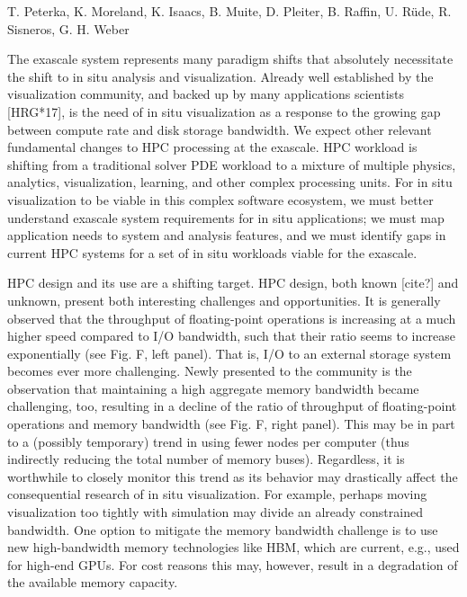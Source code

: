 
\license

 T. Peterka, K. Moreland, K. Isaacs, B. Muite, D. Pleiter, B. Raffin, U.  Rüde, R. Sisneros, G. H. Weber

\begin{refsection}

The exascale system represents many paradigm shifts that absolutely necessitate the shift to in situ analysis and visualization. Already well established by the visualization community, and backed up by many applications scientists [HRG*17], is the need of in situ visualization as a response to the growing gap between compute rate and disk storage bandwidth.
We expect other relevant fundamental changes to HPC processing at the exascale. HPC workload is shifting from a traditional solver PDE workload to a mixture of multiple physics, analytics, visualization, learning, and other complex processing units. For in situ visualization to be viable in this complex software ecosystem, we must better understand exascale system requirements for in situ applications; we must map application needs to system and analysis features, and we must identify gaps in current HPC systems for a set of in situ workloads viable for the exascale.

HPC design and its use are a shifting target. HPC design, both known [cite?] and unknown, present both interesting challenges and opportunities.
It is generally observed that the throughput of floating-point operations is increasing at a much higher speed compared to I/O bandwidth, such that their ratio seems to increase exponentially (see Fig. F, left panel). That is, I/O to an external storage system becomes ever more challenging. Newly presented to the community is the observation that maintaining a high aggregate memory bandwidth became challenging, too, resulting in a decline of the ratio of throughput of floating-point operations and memory bandwidth (see Fig. F, right panel). This may be in part to a (possibly temporary) trend in using fewer nodes per computer (thus indirectly reducing the total number of memory buses). Regardless, it is worthwhile to closely monitor this trend as its behavior may drastically affect the consequential research of in situ visualization. For example, perhaps moving visualization too tightly with simulation may divide an already constrained bandwidth. One option to mitigate the memory bandwidth challenge is to use new high-bandwidth memory technologies like HBM, which are current, e.g., used for high-end GPUs. For cost reasons this may, however, result in a degradation of the available memory capacity.


\end{refsection}
